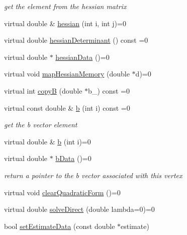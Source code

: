 \begin{DoxyCompactItemize}
\begin{DoxyCompactList}\small\item\em get the element from the hessian matrix \end{DoxyCompactList}\item 
virtual double \& \hyperlink{classg2o_1_1OptimizableGraph_1_1Vertex_ade95d46370bb9a86f64c4e591726ad62}{hessian} (int i, int j)=0
\item 
virtual double \hyperlink{classg2o_1_1OptimizableGraph_1_1Vertex_adaed502500d9ddc9f1721aba635da4d6}{hessian\+Determinant} () const =0
\item 
virtual double $\ast$ \hyperlink{classg2o_1_1OptimizableGraph_1_1Vertex_a4ec536d8c82d839e507d89c7a7e368ae}{hessian\+Data} ()=0
\item 
virtual void \hyperlink{classg2o_1_1OptimizableGraph_1_1Vertex_a1008c0f7981a9fb11be3e3df5c4a9758}{map\+Hessian\+Memory} (double $\ast$d)=0
\item 
virtual int \hyperlink{classg2o_1_1OptimizableGraph_1_1Vertex_af544f0050ea6e05950fd6e53931bdf61}{copyB} (double $\ast$b\+\_\+) const =0
\item 
virtual const double \& \hyperlink{classg2o_1_1OptimizableGraph_1_1Vertex_a79afa60eb11928eeeb1b97f2d2a30732}{b} (int i) const =0
\begin{DoxyCompactList}\small\item\em get the b vector element \end{DoxyCompactList}\item 
virtual double \& \hyperlink{classg2o_1_1OptimizableGraph_1_1Vertex_af2d92761ad2732b6e9b19bd52fa2a19b}{b} (int i)=0
\item 
virtual double $\ast$ \hyperlink{classg2o_1_1OptimizableGraph_1_1Vertex_a84465a61c6d322f7d64833129cc7d55a}{b\+Data} ()=0
\begin{DoxyCompactList}\small\item\em return a pointer to the b vector associated with this vertex \end{DoxyCompactList}\item 
virtual void \hyperlink{classg2o_1_1OptimizableGraph_1_1Vertex_a803897f6bae25dece4d7e23330f0f9da}{clear\+Quadratic\+Form} ()=0
\item 
virtual double \hyperlink{classg2o_1_1OptimizableGraph_1_1Vertex_a61c4e7b7a7a61e1f287069a8cb01004f}{solve\+Direct} (double lambda=0)=0
\item 
bool \hyperlink{classg2o_1_1OptimizableGraph_1_1Vertex_acebbe12160c0df7c859a349781badc30}{set\+Estimate\+Data} (const double $\ast$estimate)

\end{DoxyCompactItemize}
